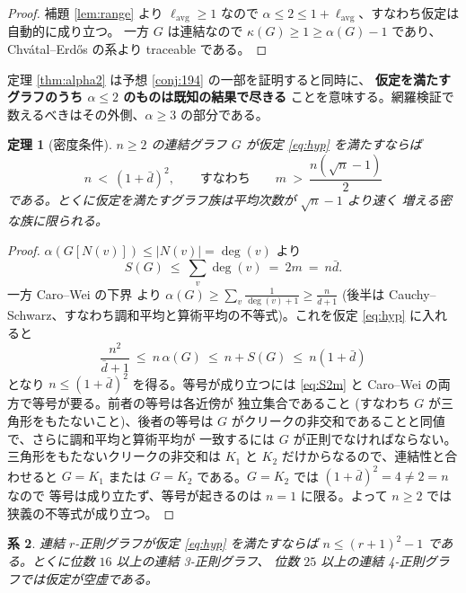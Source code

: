 \documentclass[paper=a4,fontsize=10.5pt,jafontsize=10.5pt]{jlreq}
\theoremstyle{plain}
\newtheorem{theorem}{定理}[section]
\newtheorem{corollary}[theorem]{系}
\theoremstyle{definition}
\begin{document}
\begin{proof}
補題 \ref{lem:range} より $\ell_{\mathrm{avg}} \ge 1$ なので
$\alpha \le 2 \le 1 + \ell_{\mathrm{avg}}$、すなわち仮定は自動的に成り立つ。
一方 $G$ は連結なので $\kappa(G) \ge 1 \ge \alpha(G) - 1$ であり、
Chvátal--Erdős \cite{chvatalerdos} の系より traceable である。
\end{proof}

定理 \ref{thm:alpha2} は予想 \ref{conj:194} の一部を証明すると同時に、
\textbf{仮定を満たすグラフのうち $\alpha \le 2$ のものは既知の結果で尽きる}
ことを意味する。網羅検証で数えるべきはその外側、$\alpha \ge 3$ の部分である。

\begin{theorem}[密度条件]\label{thm:density}
$n \ge 2$ の連結グラフ $G$ が仮定 \eqref{eq:hyp} を満たすならば
\[ n \ < \ (1 + \bar{d})^2, \qquad \text{すなわち} \qquad
   m \ > \ \frac{n(\sqrt{n} - 1)}{2} \]
である。とくに仮定を満たすグラフ族は平均次数が $\sqrt{n} - 1$ より速く
増える\emph{密な}族に限られる。
\end{theorem}

\begin{proof}
$\alpha(G[N(v)]) \le |N(v)| = \deg(v)$ より
\begin{equation}\label{eq:S2m}
S(G) \ \le \ \sum_{v} \deg(v) \ = \ 2m \ = \ n \bar{d} .
\end{equation}
一方 Caro--Wei の下界 \cite{carowei} より
$\alpha(G) \ge \sum_{v} \frac{1}{\deg(v)+1} \ge \frac{n}{\bar{d}+1}$
(後半は Cauchy--Schwarz、すなわち調和平均と算術平均の不等式)。これを仮定
\eqref{eq:hyp} に入れると
\[ \frac{n^2}{\bar{d}+1} \ \le \ n\,\alpha(G) \ \le \ n + S(G)
   \ \le \ n(1 + \bar{d}) \]
となり $n \le (1+\bar{d})^2$ を得る。等号が成り立つには
\eqref{eq:S2m} と Caro--Wei の両方で等号が要る。前者の等号は各近傍が
独立集合であること (すなわち $G$ が三角形をもたないこと)、後者の等号は
$G$ がクリークの非交和であることと同値で、さらに調和平均と算術平均が
一致するには $G$ が正則でなければならない。三角形をもたないクリークの非交和は
$K_1$ と $K_2$ だけからなるので、連結性と合わせると $G = K_1$ または
$G = K_2$ である。$G = K_2$ では $(1+\bar{d})^2 = 4 \neq 2 = n$ なので
等号は成り立たず、等号が起きるのは $n = 1$ に限る。よって $n \ge 2$ では
狭義の不等式が成り立つ。
\end{proof}

\begin{corollary}\label{cor:reg}
連結 $r$-正則グラフが仮定 \eqref{eq:hyp} を満たすならば
$n \le (r+1)^2 - 1$ である。とくに位数 $16$ 以上の連結 3-正則グラフ、
位数 $25$ 以上の連結 4-正則グラフでは仮定が空虚である。
\end{corollary}
\end{document}
